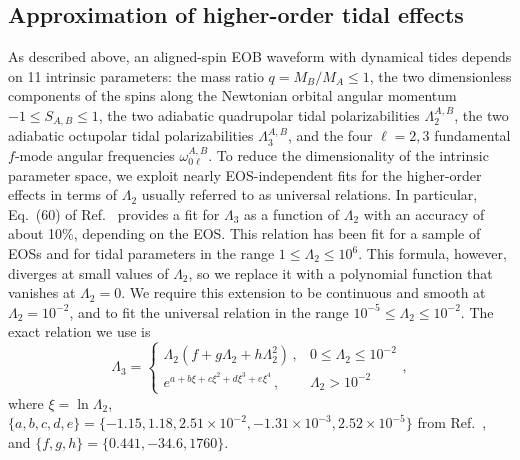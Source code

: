 \documentclass[prd,aps,letter,twocolumn,floatfix,notitlepage,nofootinbib]{revtex4-1}
\begin{document}
\subsection{Approximation of higher-order tidal effects}

As described above, an aligned-spin EOB waveform with dynamical tides depends on 11 intrinsic parameters: the mass ratio $q=M_B/M_A\leq1$, the two dimensionless components of the spins along the Newtonian orbital angular momentum $-1 \leq S_{A,B} \leq 1$, the two adiabatic quadrupolar tidal polarizabilities $\Lambda_2^{A,B}$, the two adiabatic octupolar tidal polarizabilities $\Lambda_3^{A,B}$, and the four $\ell=2,3$ fundamental $f$-mode angular frequencies $\omega_{0\ell}^{A,B}$. To reduce the dimensionality of the intrinsic parameter space, we exploit nearly EOS-independent fits for the higher-order effects in terms of $\Lambda_2$ usually referred to as universal relations. In particular, Eq.~(60) of Ref.~\cite{Yagi:2013sva} provides a fit for $\Lambda_3$ as a function of $\Lambda_2$ with an accuracy of about 10\%, depending on the EOS. This relation has been fit for a sample of EOSs and for tidal parameters in the range $1 \leq \Lambda_2\leq10^6$. This formula, however, diverges at small values of $\Lambda_2$, so we replace it with a polynomial function that vanishes at $\Lambda_2 = 0$. We require this extension to be continuous and smooth at $\Lambda_2 = 10^{-2}$, and to fit the universal relation in the range $10^{-5}\leq\Lambda_2\leq10^{-2}$. The exact relation we use is
\begin{equation}
\Lambda_3 = \left\{\begin{array}{ll}
\Lambda_2 (f + g \Lambda_2 + h \Lambda_2^2)\, , & 0 \leq \Lambda_2 \leq 10^{-2} \\
e^{a + b \xi + c \xi^2 + d \xi^3 + e \xi^4}\, , & \Lambda_2>10^{-2}
\end{array}\right.,
\end{equation}
where $\xi = \ln\Lambda_2$, $\{a, b, c, d, e\} = \{-1.15, 1.18, 2.51\times 10^{-2}, -1.31\times 10^{-3}, 2.52\times 10^{-5}\}$ from Ref.~\cite{Yagi:2013sva}, and $\{f, g, h\}=\{0.441, -34.6, 1760\}$.
\end{document}

